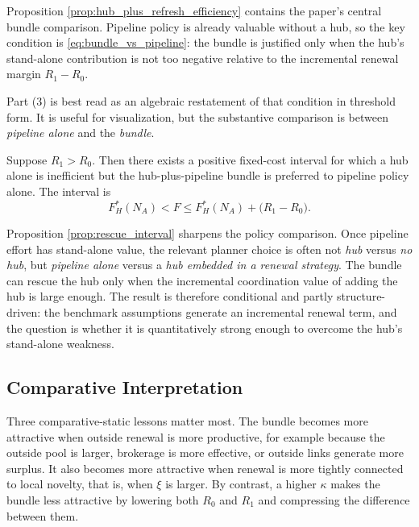 Proposition \ref{prop:hub_plus_refresh_efficiency} contains the paper's central bundle comparison. Pipeline policy is already valuable without a hub, so the key condition is \eqref{eq:bundle_vs_pipeline}: the bundle is justified only when the hub's stand-alone contribution is not too negative relative to the incremental renewal margin $R_1-R_0$.

Part (3) is best read as an algebraic restatement of that condition in threshold form. It is useful for visualization, but the substantive comparison is between \emph{pipeline alone} and the \emph{bundle}.

\begin{proposition}
\label{prop:rescue_interval}
Suppose $R_1>R_0$. Then there exists a positive fixed-cost interval for which a hub alone is inefficient but the hub-plus-pipeline bundle is preferred to pipeline policy alone. The interval is
\begin{equation}
F_H^*(N_A)
<
F
\le
F_H^*(N_A)+\bigl(R_1-R_0\bigr).
\label{eq:rescue_interval}
\end{equation}
\end{proposition}

Proposition \ref{prop:rescue_interval} sharpens the policy comparison. Once pipeline effort has stand-alone value, the relevant planner choice is often not \emph{hub} versus \emph{no hub}, but \emph{pipeline alone} versus a \emph{hub embedded in a renewal strategy}. The bundle can rescue the hub only when the incremental coordination value of adding the hub is large enough. The result is therefore conditional and partly structure-driven: the benchmark assumptions generate an incremental renewal term, and the question is whether it is quantitatively strong enough to overcome the hub's stand-alone weakness.

\subsection{Comparative Interpretation}

Three comparative-static lessons matter most. The bundle becomes more attractive when outside renewal is more productive, for example because the outside pool is larger, brokerage is more effective, or outside links generate more surplus. It also becomes more attractive when renewal is more tightly connected to local novelty, that is, when $\xi$ is larger. By contrast, a higher $\kappa$ makes the bundle less attractive by lowering both $R_0$ and $R_1$ and compressing the difference between them.

